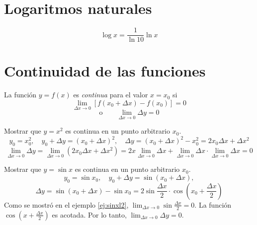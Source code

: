 \section{Logaritmos naturales}

\[ \log x = \frac{1}{\ln 10} \ln x \]


\section{Continuidad de las funciones}


\begin{definition}
  La función \( y = f(x) \) es \emph{continua} para el valor \( x = x_0 \) si
  \begin{equation} \label{eq:condicioncontinuidad}
  \lim_{\Delta x \to 0} \left[ f(x_0 + \Delta x) - f(x_0) \right] = 0
  \end{equation}
  \[
  \text{o} \qquad
  \lim_{\Delta x \to 0} \Delta y = 0
  \]
\end{definition}


\begin{example}
  Mostrar que \( y = x^2 \) es continua en un punto arbitrario \( x_0 \).
  \[
  y_0 = x_0^2, \quad
  y_0 + \Delta y = \left( x_0 + \Delta x \right)^2, \quad
  \Delta y = \left( x_0 + \Delta x \right)^2 - x_0^2
  = 2 x_0 \Delta x + \Delta x^2
  \]
  \[
  \lim_{\Delta x \to 0} \Delta y
  = \lim_{\Delta x \to 0} \left( 2 x_0 \Delta x + \Delta x^2 \right)
  = 2x \lim_{\Delta x \to 0} \Delta x
    + \lim_{\Delta x \to 0} \Delta x \cdot \lim_{\Delta x \to 0} \Delta x = 0
  \]
\end{example}




\begin{example}
  Mostrar que \( y = \sin x \) es continua en un punto arbitrario \( x_0 \).
  \[
  y_0 = \sin x_0, \quad
  y_0 + \Delta y = \sin \left( x_0 + \Delta x \right),
  \]
  \[
  \Delta y = \sin \left( x_0 + \Delta x \right) - \sin x_0
  = 2 \sin \frac {\Delta x} {2}
    \cdot \cos \left( x_0 + \frac {\Delta x} {2} \right)
  \]
  Como se mostró en el ejemplo \ref{ej:sinxl2}, \( \lim_{\Delta x \to 0} \sin \frac {\Delta x} {2} = 0 \). La función \( \cos ( x + \frac {\Delta x} {2} ) \) es acotada. Por lo tanto, \( \lim_{\Delta x \to 0} \Delta y = 0 \).
\end{example}


